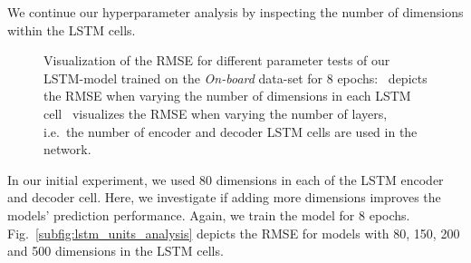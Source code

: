 We continue our hyperparameter analysis by inspecting the number of dimensions within the \ac{LSTM} cells.
\begin{figure}[t!]
	\centering
    \vspace{-0.3cm}
    \caption{Visualization of the \ac{RMSE} for different parameter tests of our \ac{LSTM}-model trained on the \emph{On-board} data-set for \num{8} epochs:~\protect{} depicts the \ac{RMSE} when varying the number of dimensions in each \ac{LSTM} cell~\protect{} visualizes the \ac{RMSE} when varying the number of layers, i.e.\ the number of encoder and decoder \ac{LSTM} cells are used in the network.}
    \label{fig:lstm_units_layers_analysis}
\end{figure}
In our initial experiment, we used \num{80} dimensions in each of the \ac{LSTM} encoder and decoder cell.
Here, we investigate if adding more dimensions improves the models' prediction performance.
Again, we train the model for \num{8} epochs.
Fig.~\ref{subfig:lstm_units_analysis} depicts the \ac{RMSE} for models with \num{80}, \num{150}, \num{200} and \num{500} dimensions in the \ac{LSTM} cells.
